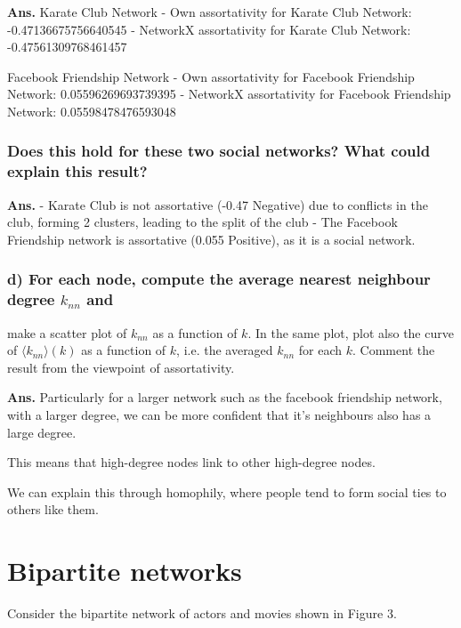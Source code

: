 \documentclass[11pt]{article}
\begin{document}
\textbf{Ans.} Karate Club Network - Own assortativity for Karate Club
Network: -0.47136675756640545 - NetworkX assortativity for Karate Club
Network: -0.47561309768461457

Facebook Friendship Network - Own assortativity for Facebook Friendship
Network: 0.05596269693739395 - NetworkX assortativity for Facebook
Friendship Network: 0.05598478476593048

\subsubsection{Does this hold for these two social networks? What could
explain this
result?}\label{does-this-hold-for-these-two-social-networks-what-could-explain-this-result}

\textbf{Ans.} - Karate Club is not assortative (-0.47 Negative) due to
conflicts in the club, forming 2 clusters, leading to the split of the
club - The Facebook Friendship network is assortative (0.055 Positive),
as it is a social network.

    \subsubsection{\texorpdfstring{d) For each node, compute the average
nearest neighbour degree \(k_{nn}\)
and}{d) For each node, compute the average nearest neighbour degree k\_\{nn\} and}}\label{d-for-each-node-compute-the-average-nearest-neighbour-degree-k_nn-and}

make a scatter plot of \(k _{nn}\) as a function of \(k\). In the same
plot, plot also the curve of \(\langle k_{nn} \rangle (k)\) as a
function of \(k\), i.e. the averaged \(k_{nn}\) for each \(k\). Comment
the result from the viewpoint of assortativity.

\textbf{Ans.} Particularly for a larger network such as the facebook
friendship network, with a larger degree, we can be more confident that
it's neighbours also has a large degree.

This means that high-degree nodes link to other high-degree nodes.

We can explain this through homophily, where people tend to form social
ties to others like them.

    \section{Bipartite networks}\label{bipartite-networks}

Consider the bipartite network of actors and movies shown in Figure 3.
\end{document}
